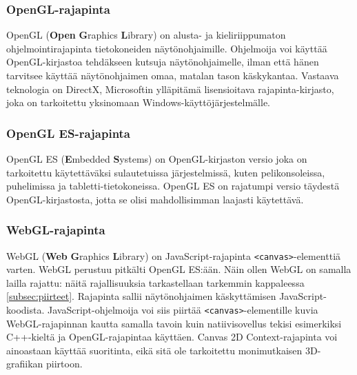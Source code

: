 \subsubsection{OpenGL-rajapinta}
OpenGL (\textbf{Open} \textbf{G}raphics \textbf{L}ibrary) on alusta- ja kieliriippumaton ohjelmointirajapinta tietokoneiden näytönohjaimille\cite{opengl4}. Ohjelmoija voi käyttää OpenGL-kirjastoa tehdäkseen kutsuja näytönohjaimelle, ilman että hänen tarvitsee käyttää näytönohjaimen omaa, matalan tason käskykantaa. Vastaava teknologia on DirectX\cite{directx}, Microsoftin ylläpitämä lisensioitava rajapinta-kirjasto, joka on tarkoitettu yksinomaan Windows-käyttöjärjestelmälle.

\subsubsection{OpenGL ES-rajapinta}
OpenGL ES (\textbf{E}mbedded \textbf{S}ystems) on OpenGL-kirjaston versio joka on tarkoitettu käytettäväksi sulautetuissa järjestelmissä, kuten pelikonsoleissa, puhelimissa ja tabletti-tietokoneissa. OpenGL ES on rajatumpi versio täydestä OpenGL-kirjastosta, jotta se olisi mahdollisimman laajasti käytettävä.\cite{opengles} 

\subsubsection{WebGL-rajapinta}
WebGL (\textbf{Web} \textbf{G}raphics \textbf{L}ibrary) on JavaScript-rajapinta \texttt{<canvas>}-elementtiä varten. WebGL perustuu pitkälti OpenGL ES:ään\cite{webgl_specification}. Näin ollen WebGL on samalla lailla rajattu: näitä rajallisuuksia tarkastellaan tarkemmin kappaleessa \ref{subsec:piirteet}. Rajapinta sallii näytönohjaimen käskyttämisen JavaScript-koodista. JavaScript-ohjelmoija voi siis piirtää \texttt{<canvas>}-elementille kuvia WebGL-rajapinnan kautta samalla tavoin kuin natiivisovellus tekisi esimerkiksi C++-kieltä ja OpenGL-rajapintaa käyttäen. Canvas 2D Context-rajapinta voi ainoastaan käyttää suoritinta, eikä sitä ole tarkoitettu monimutkaisen 3D-grafiikan piirtoon.
